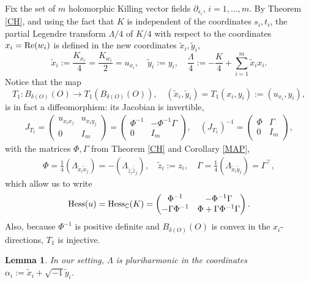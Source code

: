 \documentclass[11pt,reqno]{amsart}
\theoremstyle{plain}
\newtheorem{lemma}[theorem]{Lemma}
\theoremstyle{definition}
\numberwithin{equation}{section}
\begin{document}
Fix the set of $m$ holomorphic Killing vector fields $\partial_{s_i}$, $i = 1, \ldots, m$. By Theorem \ref{CH}, and using the fact that $K$ is independent of the coordinates $s_{i},t_{i}$, the partial Legendre transform $\Lambda/4$ of $K/4$ with respect to the coordinates $x_i = {\rm Re}(w_i)$ is defined in the new coordinates $\tilde{x}_{i},\tilde{y}_{i}$,
$$\tilde{x}_{i}:=\frac{K_{x_i}}{4} = \frac{K_{w_{i}}}{2}=u_{x_{i}},\quad  \tilde{y}_{i}:=y_{i},\quad  \frac{\Lambda}{4} := -\frac{K}{4} + \sum_{i=1}^m \tilde{x}_i x_i.$$
Notice that the map
\begin{equation}\label{mapT1}
T_{1}:B_{\delta(O)}(O)\to T_{1}(B_{\delta(O)}(O)),  \quad (\tilde{x}_{i},\tilde{y}_{i}) = T_{1}(x_{i},y_{i}) := (u_{x_{i}},y_{i}),
\end{equation}
is in fact a diffeomorphism: its Jacobian is invertible,
\begin{align}J_{T_{1}}=\begin{pmatrix}
    u_{x_{i}x_{j}} & u_{x_{i}y_{j}}  \\
     0 & I_{m}
\end{pmatrix}=\begin{pmatrix}
    \Phi^{-1} & -\Phi^{-1}\Gamma  \\
    0 & I_{m} \end{pmatrix}, \quad \label{JacT1} (J_{T_{1}})^{-1}=\begin{pmatrix}
    \Phi & \Gamma \\
     0 & I_{m}  
\end{pmatrix},\end{align}
with the matrices $\Phi,\Gamma$ from Theorem \ref{CH} and Corollary \ref{MAP},
\begin{align}\label{ph}\Phi=\frac{1}{4}(\Lambda_{\tilde{x}_{i}\tilde{x}_{j}}) = -(\Lambda_{\tilde{z}_{i}\overline{\tilde{z}}_{j}}), \quad \tilde{z}_i := z_i, \quad  \Gamma=\frac{1}{4}(\Lambda_{\tilde{x}_{i}\tilde{y}_{j}}) = \Gamma^\top,\end{align}
which allow us to write 
$${\rm Hess}(u) = {\rm Hess}_{\mathbb{C}}(K) = \begin{pmatrix}
   \Phi^{-1}  & -\Phi^{-1}\Gamma   \\
   - {\Gamma}\Phi^{-1}  & \Phi +{\Gamma} \Phi^{-1} \Gamma
\end{pmatrix}.$$
Also, because $\Phi^{-1}$ is positive definite and $B_{\delta(O)}(O)$ is convex in the $x_i$-directions, $T_1$ is injective.

\begin{lemma}\label{alpha}
    In our setting, $\Lambda$ is pluriharmonic in the coordinates $\alpha_i := \tilde{x}_i + \sqrt{-1}\tilde{y}_i$.
\end{lemma}
\end{document}
